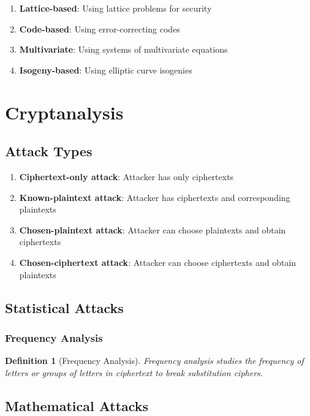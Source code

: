 \documentclass[11pt,a4paper]{article}
\newtheorem{definition}[theorem]{Definition}
\begin{document}
\begin{enumerate}
\item \textbf{Lattice-based}: Using lattice problems for security
\item \textbf{Code-based}: Using error-correcting codes
\item \textbf{Multivariate}: Using systems of multivariate equations
\item \textbf{Isogeny-based}: Using elliptic curve isogenies
\end{enumerate}

\section{Cryptanalysis}

\subsection{Attack Types}

\begin{enumerate}
\item \textbf{Ciphertext-only attack}: Attacker has only ciphertexts
\item \textbf{Known-plaintext attack}: Attacker has ciphertexts and corresponding plaintexts
\item \textbf{Chosen-plaintext attack}: Attacker can choose plaintexts and obtain ciphertexts
\item \textbf{Chosen-ciphertext attack}: Attacker can choose ciphertexts and obtain plaintexts
\end{enumerate}

\subsection{Statistical Attacks}

\subsubsection{Frequency Analysis}

\begin{definition}[Frequency Analysis]
Frequency analysis studies the frequency of letters or groups of letters in ciphertext to break substitution ciphers.
\end{definition}

\subsection{Mathematical Attacks}
\end{document}
